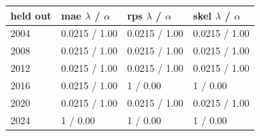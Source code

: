 
\begin{tabular}{llll}
\toprule
held out & mae $\lambda$ / $\alpha$ & rps $\lambda$ / $\alpha$ & skel $\lambda$ / $\alpha$\\
\midrule
2004 & 0.0215 / 1.00 & 0.0215 / 1.00 & 0.0215 / 1.00\\
2008 & 0.0215 / 1.00 & 0.0215 / 1.00 & 0.0215 / 1.00\\
2012 & 0.0215 / 1.00 & 0.0215 / 1.00 & 0.0215 / 1.00\\
2016 & 0.0215 / 1.00 & 1 / 0.00 & 1 / 0.00\\
2020 & 0.0215 / 1.00 & 0.0215 / 1.00 & 0.0215 / 1.00\\
2024 & 1 / 0.00 & 1 / 0.00 & 1 / 0.00\\
\bottomrule
\end{tabular}
